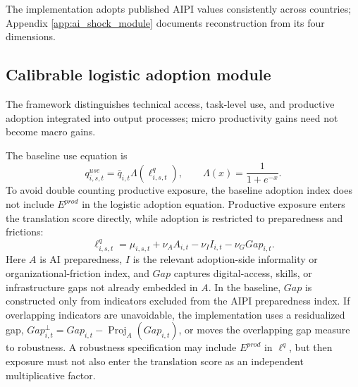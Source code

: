 \documentclass[11pt,a4paper]{article}
\begin{document}
The implementation adopts published AIPI values consistently across countries; Appendix \ref{app:ai_shock_module} documents reconstruction from its four dimensions.


\subsection{Calibrable logistic adoption module}\label{subsec:logistic_adoption_main}

The framework distinguishes technical access, task-level use, and productive adoption integrated into output processes; micro productivity gains need not become macro gains.

The baseline use equation is
\begin{equation}\label{eq:q_use_logistic_main_v10}
    q^{use}_{i,s,t}=\bar q_{i,t}\Lambda(\ell^q_{i,s,t}),
    \qquad
    \Lambda(x)=\frac{1}{1+e^{-x}}.
\end{equation}
To avoid double counting productive exposure, the baseline adoption index does not include $E^{prod}$ in the logistic adoption equation. Productive exposure enters the translation score directly, while adoption is restricted to preparedness and frictions:
\begin{equation}\label{eq:eta_noE_main_v10}
    \ell^q_{i,s,t}=\mu_{i,s,t}+\nu_A A_{i,t}-\nu_I I_{i,t}-\nu_G Gap_{i,t}.
\end{equation}
Here $A$ is AI preparedness, $I$ is the relevant adoption-side informality or organizational-friction index, and $Gap$ captures digital-access, skills, or infrastructure gaps not already embedded in $A$. In the baseline, $Gap$ is constructed only from indicators excluded from the AIPI preparedness index. If overlapping indicators are unavoidable, the implementation uses a residualized gap, $Gap^{\perp}_{i,t}=Gap_{i,t}-\operatorname{Proj}_{A}(Gap_{i,t})$, or moves the overlapping gap measure to robustness. A robustness specification may include $E^{prod}$ in $\ell^q$, but then exposure must not also enter the translation score as an independent multiplicative factor.
\end{document}
